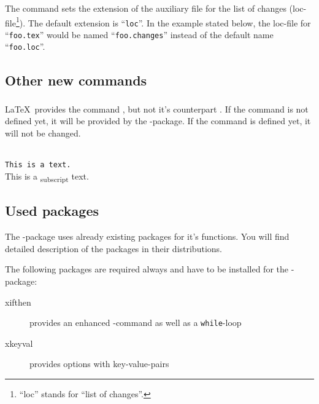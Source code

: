 


\subsubsection{}
\DescribeMacro{\setlocextension}

The command  sets the extension of the auxiliary file for the list of changes (loc-file\footnote{%
	``loc'' stands for ``list of changes''.
}).
The default extension is ``\texttt{loc}''.
In the example stated below, the loc-file for ``\texttt{foo.tex}'' would be named ``\texttt{foo.changes}'' instead of the default name ``\texttt{foo.loc}''.




\subsection{Other new commands}
\label{sec:user:other}

\subsubsection{}
\DescribeMacro{\textsubscript}

\LaTeX\ provides the command , but not it's counterpart .
If the command is not defined yet, it will be provided by the -package.
If the command is defined yet, it will not be changed.
\begin{chusage}
		\>\\
	\usageexample
		\>\texttt{This is a  text.}\\
		\>This is a \textsubscript{subscript} text.
\end{chusage}


\subsection{Used packages}
\label{sec:user:packages}

The -package uses already existing packages for it's functions.
You will find detailed description of the packages in their distributions.

The following packages are required always and have to be installed for the -package:
\begin{description}
	\item [xifthen] provides an enhanced -command as well as a \texttt{while}-loop
	\item [xkeyval] provides options with key-value-pairs
\end{description}

